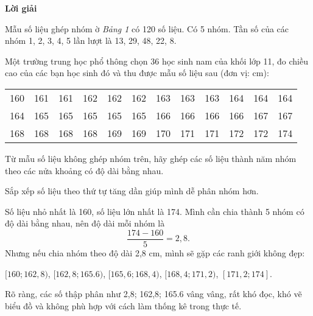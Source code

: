 \documentclass[
  letterpaper,
  DIV=11,
  numbers=noendperiod]{scrartcl}
\begin{document}
\begin{center}
\textbf{Lời giải}
\end{center}

Mẫu số liệu ghép nhóm ờ \emph{Bảng 1} có 120 số liệu. Có 5 nhóm. Tần số
của các nhóm 1, 2, 3, 4, 5 lần lượt là 13, 29, 48, 22, 8.

Một trường trung học phổ thông chọn 36 học sinh nam của khối lớp 11, đo
chiều cao của các bạn học sinh đó và thu được mẫu số liệu sau (đơn vị:
cm):

\begin{table}[!h]
\centering
\begin{tabular}{cccccccccccc}
\toprule
160 & 161 & 161 & 162 & 162 & 162 & 163 & 163 & 163 & 164 & 164 & 164\\
164 & 165 & 165 & 165 & 165 & 165 & 166 & 166 & 166 & 166 & 167 & 167\\
168 & 168 & 168 & 168 & 169 & 169 & 170 & 171 & 171 & 172 & 172 & 174\\
\bottomrule
\end{tabular}
\end{table}

Từ mẫu số liệu không ghép nhóm trên, hãy ghép các số liệu thành năm nhóm
theo các nửa khoảng có độ dài bằng nhau.

\begin{tcolorbox}[enhanced jigsaw, bottomrule=.15mm, rightrule=.15mm, toprule=.15mm, colback=white, bottomtitle=1mm, colbacktitle=quarto-callout-tip-color!10!white, breakable, opacitybacktitle=0.6, colframe=quarto-callout-tip-color-frame, toptitle=1mm, titlerule=0mm, title=\textcolor{quarto-callout-tip-color}{\faLightbulb}\hspace{0.5em}{Mẹo}, arc=.35mm, opacityback=0, leftrule=.75mm, left=2mm, coltitle=black]

Sắp xếp số liệu theo thứ tự tăng dần giúp mình dễ phân nhóm hơn.

\end{tcolorbox}

Số liệu nhỏ nhất là 160, số liệu lớn nhất là 174. Mình cần chia thành 5
nhóm có độ dài bằng nhau, nên độ dài mỗi nhóm là \[
\frac{174-160}{5}=2,8.
\] Nhưng nếu chia nhóm theo độ dài 2,8 cm, mình sẽ gặp các ranh giới
không đẹp:

\([160;162,8)\), \([162,8;165.6)\), \([165,6;168,4)\),
\([168,4;171,2)\), \([171,2;174]\).

Rõ ràng, các số thập phân như 2,8; 162,8; 165.6 vâng vâng, rất khó đọc,
khó vẽ biểu đồ và không phù hợp với cách làm thống kê trong thực tế.
\end{document}
